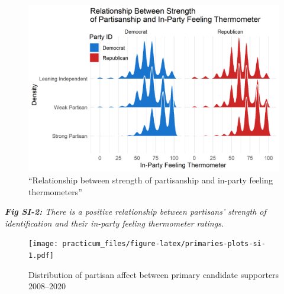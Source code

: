 \documentclass[
]{article}
\begin{document}
\begin{figure}
\centering
\includegraphics{../fig/gg-str-therm.png}
\caption{``Relationship between strength of partisanship and in-party feeling thermometers''}
\end{figure}

\emph{\textbf{Fig SI-2:} There is a positive relationship between partisans' strength of identification and their in-party feeling thermometer ratings.}

\begin{figure}
\centering
\texttt{[image: practicum\_files/figure-latex/primaries-plots-si-1.pdf]}
\caption{\label{fig:primaries-plots-si}Distribution of partisan affect between primary candidate supporters 2008--2020}
\end{figure}
\end{document}
